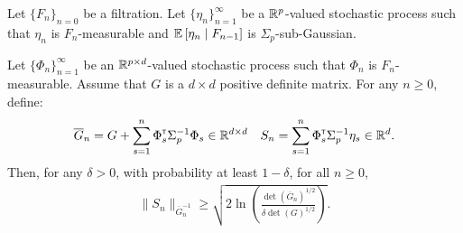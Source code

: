\documentclass{article}
\begin{document}
\begin{proposition}
\label{prop:concentration}
Let $\{F_n\}_{n=0}$ be a filtration.
Let $\{\eta_n\}_{n=1}^\infty$ be a $\mathbb{R}^p$-valued stochastic process such that $\eta_n$ is $F_n$-measurable and $\operatorname*{\mathbb{E}}\left[\eta_n\;\middle|\; F_{n-1}\right]$ is $\Sigma_p$-sub-Gaussian.

Let $\{\Phi_n\}_{n=1}^\infty$ be an $\mathbb{R}^{p\times d}$-valued stochastic process such that $\Phi_n$ is $F_n$-measurable. Assume that $G$ is a $d\times d$ positive definite matrix. For any $n\geq 0$, define:
\begin{equation*}
    \overline{G}_n = G + \sum_{s=1}^n \Phi_s^{\mathsf{\scriptscriptstyle T}} \Sigma_p^{-1} \Phi_s \in \mathbb{R}^{d\times d} \quad S_n = \sum_{s=1}^n \Phi_s^{\mathsf{\scriptscriptstyle T}}\Sigma_p^{-1}\eta_s \in \mathbb{R}^{d}.
\end{equation*}
Then, for any $\delta>0$, with probability at least $1-\delta$, for all $n\geq0$,
\begin{align*}
\| S_n \|_{\overline{G}_n^{-1}} \geq \sqrt{2\ln \left(\frac{\det\left(\overline{G}_n\right)^{1/2}}{\delta\det(G)^{1/2}}\right)}.
\end{align*}
\end{proposition}
\end{document}
